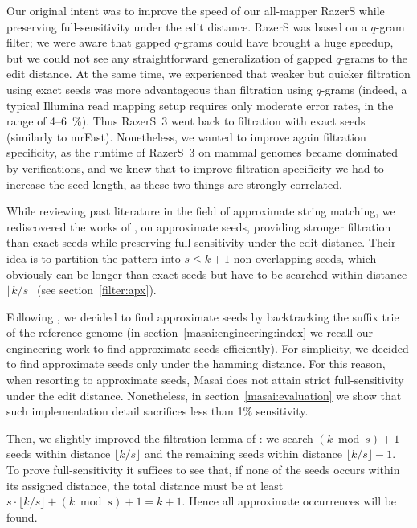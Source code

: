 
Our original intent was to improve the speed of our all-mapper RazerS \citep{Weese2009} while preserving full-sensitivity under the edit distance.
RazerS was based on a $q$-gram filter;
we were aware that gapped $q$-grams could have brought a huge speedup, but we could not see any straightforward generalization of gapped $q$-grams to the edit distance.
At the same time, we experienced that weaker but quicker filtration using exact seeds was more advantageous than filtration using $q$-grams (indeed, a typical Illumina read mapping setup requires only moderate error rates, in the range of 4--6~\%).
Thus RazerS~3 \citep{RazerS3} went back to filtration with exact seeds (similarly to mrFast).
Nonetheless, we wanted to improve again filtration specificity, as the runtime of RazerS~3 on mammal genomes became dominated by verifications, and we knew that to improve filtration specificity we had to increase the seed length, as these two things are strongly correlated.

While reviewing past literature in the field of approximate string matching, we rediscovered the works of \citeauthor{Myers1994}, \citeauthor{Navarro2000} on approximate seeds, providing stronger filtration than exact seeds while preserving full-sensitivity under the edit distance.
Their idea is to partition the pattern into $s \leq k+1$ non-overlapping seeds, which obviously can be longer than exact seeds but have to be searched within distance $\lfloor k/s \rfloor$ (see section~\ref{filter:apx}).

Following \citep{Navarro2000}, we decided to find approximate seeds by backtracking the suffix trie of the reference genome (in section~\ref{masai:engineering:index} we recall our engineering work to find approximate seeds efficiently).
For simplicity, we decided to find approximate seeds only under the hamming distance.
For this reason, when resorting to approximate seeds, Masai does not attain strict full-sensitivity under the edit distance.
Nonetheless, in section~\ref{masai:evaluation} we show that such implementation detail sacrifices less than 1\% sensitivity.

Then, we slightly improved the filtration lemma of \citep{Navarro2000}:
we search $(k \bmod{s}) + 1$ seeds within distance $\lfloor k/s \rfloor$ and the remaining seeds within distance $\lfloor k/s \rfloor - 1$.
To prove full-sensitivity it suffices to see that, if none of the seeds occurs within its assigned distance, the total distance must be at least $s \cdot \lfloor k/s \rfloor + (k \bmod s) + 1 = k + 1$.
Hence all approximate occurrences will be found.

